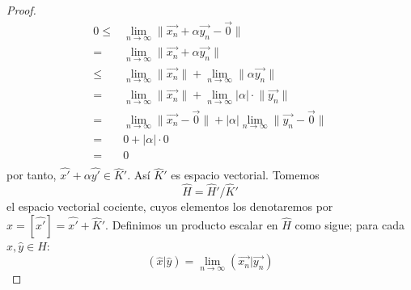 \documentclass[12pt]{report}
\theoremstyle{largebreak}
\newcommand\abs[1]{\ensuremath{\big|#1\big|}}
\newcommand\pint[2]{\ensuremath{\left(#1\big|#2\right)}}
\newcommand\norm[1]{\ensuremath{\|#1\|}}
\begin{document}
\begin{proof}
\begin{equation*}
            \begin{split}
                0\leq&\lim_{n\rightarrow\infty}\norm{\vec{x_n}+\alpha\vec{y_n}-\vec{0}}\\
                =&\lim_{n\rightarrow\infty}\norm{\vec{x_n}+\alpha\vec{y_n}}\\
                \leq&\lim_{n\rightarrow\infty}\norm{\vec{x_n}}+\lim_{n\rightarrow\infty}\norm{\alpha\vec{y_n}}\\
                =&\lim_{n\rightarrow\infty}\norm{\vec{x_n}}+\lim_{n\rightarrow\infty}\abs{\alpha}\cdot\norm{\vec{y_n}}\\
                =&\lim_{n\rightarrow\infty}\norm{\vec{x_n}-\vec{0}}+\abs{\alpha}\lim_{n\rightarrow\infty}\norm{\vec{y_n}-\vec{0}}\\
                =&0+\abs{\alpha}\cdot0\\
                =&0\\
            \end{split}
        \end{equation*}
        por tanto, $\hat{x'}+\alpha\hat{y'}\in\hat{K}'$. Así $\hat{K}'$ es espacio vectorial. Tomemos
        \begin{equation*}
            \hat{H}=\hat{H}'/\hat{K}'
        \end{equation*}
        el espacio vectorial cociente, cuyos elementos los denotaremos por $\hat{x}=[\hat{x'}]=\hat{x'}+\hat{K}'$. Definimos un producto escalar en $\hat{H}$ como sigue; para cada $\hat{x},\hat{y}\in H$:
        \begin{equation*}
            \pint{\hat{x}}{\hat{y}}=\lim_{n\rightarrow\infty }\pint{\vec{x_n}}{\vec{y_n}}
        \end{equation*}
    \end{proof}
\end{document}
